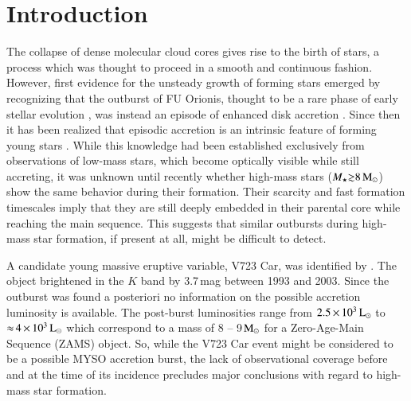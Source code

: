 \section{Introduction}\label{intro}
The collapse of dense molecular cloud cores gives rise to the birth of stars, a process which was thought to proceed in a smooth and continuous fashion. However, first evidence for the unsteady growth of forming stars emerged by recognizing that the outburst of FU Orionis, thought to be a rare phase of early stellar evolution \citep{1966VA......8..109H}, was instead an episode of enhanced disk accretion \citet{1985ApJ...299..462H}. Since then it has been realized that episodic accretion is an intrinsic feature of forming young stars \citep{1996ARA&A..34..207H, 2014prpl.conf..387A}. While this knowledge had been established exclusively from observations of low-mass stars, which become optically visible while still accreting, it was unknown until recently whether high-mass stars ($M_{\star}{\gtrsim}8\,{\rm M}_\odot$) show the same behavior during their formation. 
Their scarcity and fast formation timescales %
imply that they are still deeply embedded in their parental core while reaching the main sequence. This suggests that similar outbursts during high-mass star formation, if present at all, might be difficult to detect. 

A candidate young massive eruptive variable, V723 Car, was identified by \citet{2015MNRAS.446.4088T}. The object brightened in the $K$ band by 3.7\,mag between 1993 and 2003. Since the outburst was found a posteriori no information on the possible accretion luminosity is available. The post-burst luminosities range from $2.5\,{\times}\,10^3\,{\rm L}_\odot$ \citep{2011ApJS..194...14P} to ${\approx}\,4\,{\times}\,10^3\,{\rm L}_\odot$ \citep{2015MNRAS.446.4088T} which correspond to a mass of 8 -- 9\,${\rm M}_\odot$ \citep{1996MNRAS.281..257T} for a Zero-Age-Main Sequence (ZAMS) object.
So, while the V723 Car event might be considered to be a possible MYSO accretion burst, the lack of observational coverage before and at the time of its incidence precludes major conclusions with regard to high-mass star formation.

